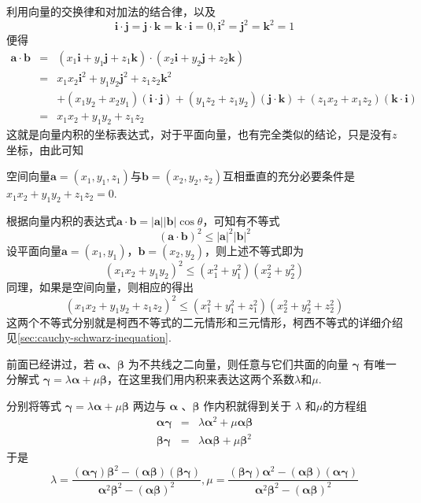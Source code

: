 利用向量的交换律和对加法的结合律，以及
\[ \bm{i} \cdot \bm{j} = \bm{j} \cdot \bm{k} = \bm{k} \cdot \bm{i} = 0, \bm{i}^2 = \bm{j}^2 = \bm{k}^2=1 \]
便得
\begin{eqnarray*}
  \bm{a} \cdot \bm{b} & = & (x_1 \bm{i} + y_1 \bm{j} + z_1 \bm{k}) \cdot (x_2 \bm{i} + y_2 \bm{j} + z_2 \bm{k}) \\
                  & = & x_1x_2 \bm{i}^2 + y_1y_2 \bm{j}^2 + z_1z_2 \bm{k}^2 \\
                  &   & + (x_1y_2+x_2y_1)(\bm{i} \cdot \bm{j}) + (y_1z_2+z_1y_2)(\bm{j} \cdot \bm{k}) + (z_1x_2 + x_1z_2)(\bm{k} \cdot \bm{i}) \\
                  & = & x_1x_2 + y_1y_2+z_1z_2
\end{eqnarray*}
这就是向量内积的坐标表达式，对于平面向量，也有完全类似的结论，只是没有$z$坐标，由此可知

\begin{theorem}
  空间向量$\bm{a}=(x_1,y_1,z_1)$与$\bm{b} = (x_2,y_2,z_2)$互相垂直的充分必要条件是$x_1x_2+y_1y_2+z_1z_2=0$.
\end{theorem}

根据向量内积的表达式$\bm{a}\cdot\bm{b}=|\bm{a}||\bm{b}|\cos{\theta}$，可知有不等式
\[ (\bm{a}\cdot\bm{b})^2 \leqslant |\bm{a}|^2 |\bm{b}|^2 \]
设平面向量$\bm{a}=(x_1,y_1)$，$\bm{b}=(x_2,y_2)$，则上述不等式即为
\[ (x_1x_2+y_1y_2)^2 \leqslant (x_1^2+y_1^2)(x_2^2+y_2^2) \]
同理，如果是空间向量，则相应的得出
\[ (x_1x_2+y_1y_2+z_1z_2)^2 \leqslant (x_1^2+y_1^2+z_1^2)(x_2^2+y_2^2+z_2^2) \]
这两个不等式分别就是柯西不等式的二元情形和三元情形，柯西不等式的详细介绍见\autoref{sec:cauchy-schwarz-inequation}.

\begin{example}[用内积表达向量分解系数]
  前面已经讲过，若 $\bm \alpha$、$\bm \beta$ 为不共线之二向量，则任意与它们共面的向量 $\bm \gamma $ 有唯一分解式 $\bm \gamma = \lambda \bm \alpha + \mu \bm \beta$，在这里我们用内积来表达这两个系数$\lambda$和$\mu$.

  分别将等式 $\bm \gamma = \lambda \bm \alpha + \mu \bm \beta$ 两边与 $\bm \alpha$ 、$\bm \beta$ 作内积就得到关于 $\lambda$ 和$\mu$的方程组
\begin{eqnarray*}
  \bm \alpha \bm \gamma  & = & \lambda \bm \alpha^2 + \mu \bm \alpha \bm \beta \\
  \bm \beta \bm \gamma  & = & \lambda \bm \alpha \bm \beta + \mu \bm \beta^2 
\end{eqnarray*}
于是
\[ \lambda = \frac{(\bm \alpha \bm \gamma)\bm\beta^{2}-(\bm \alpha \bm \beta)(\bm \beta \bm \gamma)}{\bm \alpha^2 \bm \beta^2-(\bm \alpha \bm \beta)^2},
  \mu = \frac{(\bm \beta \bm \gamma)\bm \alpha^2-(\bm \alpha \bm \beta)(\bm \alpha \bm \gamma)}{\bm \alpha^2 \bm \beta^2-(\bm \alpha \bm \beta)^2} \]
\end{example}

